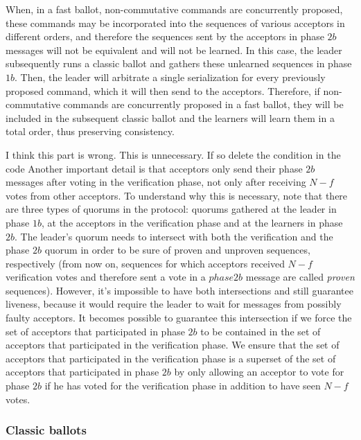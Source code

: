  When, in a fast ballot, non-commutative commands are  concurrently proposed, these commands may be incorporated into the sequences of various acceptors in different orders, and therefore the sequences sent by the acceptors in phase $2b$ messages will not be equivalent and will not be learned. In this case, the leader subsequently runs a classic ballot and gathers these unlearned sequences in phase $1b$. Then, the leader will arbitrate a single serialization for every previously proposed command, which it will then send to the acceptors. Therefore, if non-commutative commands are concurrently proposed in a fast ballot, they will be included in the subsequent classic ballot and the learners will learn them in a total order, thus preserving consistency.\par
{} 
{\color{red} I think this part is wrong. This is unnecessary. If so delete the condition in the code}
Another important detail is that acceptors only send their phase $2b$ messages after voting in the verification phase, not only after receiving $N-f$ votes from other acceptors. To understand why this is necessary, note that there are three types of quorums in the protocol: quorums gathered at the leader in phase $1b$, at the acceptors in the verification phase and at the learners in phase $2b$. The leader's quorum needs to intersect with both the verification and the phase $2b$ quorum in order to be sure of proven and unproven sequences, respectively (from now on, sequences for which acceptors received $N-f$ verification votes and therefore sent a vote in a $phase 2b$ message are called \textit{proven} sequences). However, it's impossible to have both intersections and still guarantee liveness, because it would require the leader to wait for messages from possibly faulty acceptors. It becomes possible to guarantee this intersection if we force the set of acceptors that participated in phase $2b$ to be contained in the set of acceptors that participated in the verification phase. We ensure that the set of acceptors that participated in the verification phase is a superset of the set of acceptors that participated in phase $2b$ by only allowing an acceptor to vote for phase $2b$ if he has voted for the verification phase in addition to have seen $N-f$ votes.

\subsubsection{Classic ballots} 

